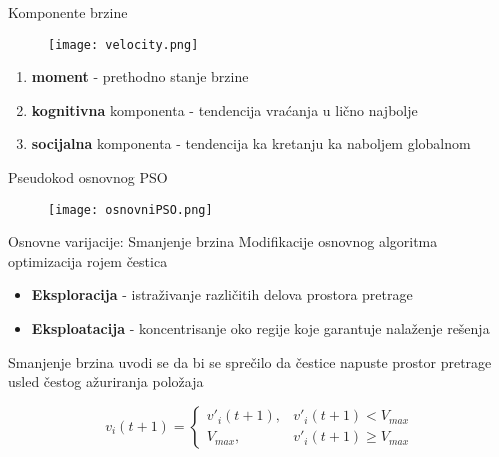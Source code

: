 \documentclass{beamer}
\begin{document}
\begin{frame}{Komponente brzine}
    \begin{figure}[htp]
    \centering
    \texttt{[image: velocity.png]}
    
\end{figure}

\begin{enumerate}
    \item \textbf{moment} - prethodno stanje brzine
    \item \textbf{kognitivna} komponenta - tendencija vraćanja u lično najbolje
    \item \textbf{socijalna} komponenta - tendencija ka kretanju ka naboljem globalnom
\end{enumerate}

\end{frame}


\begin{frame}{Pseudokod osnovnog PSO}
    
    \begin{figure}[htp]
    \centering
    \texttt{[image: osnovniPSO.png]}
    
\end{figure}  
    
\end{frame}

\begin{frame}{Osnovne varijacije: Smanjenje brzina}
Modifikacije osnovnog algoritma optimizacija rojem čestica

\begin{itemize}
    \item \textbf{Eksploracija} - istraživanje različitih delova prostora pretrage
    \item \textbf{Eksploatacija}  -  koncentrisanje oko regije koje garantuje nalaženje rešenja
\end{itemize}
Smanjenje brzina uvodi se da bi se sprečilo da čestice napuste  prostor pretrage usled čestog ažuriranja položaja


\begin{equation}
    v_i(t+1) = \begin{cases}
                
            v'_i(t+1),  &  v'_i(t+1) < V_{max}\\
            V_{max},  &   v'_i(t+1) \geq V_{max}
           
             \end{cases}
\end{equation}

\end{frame}
\end{document}

